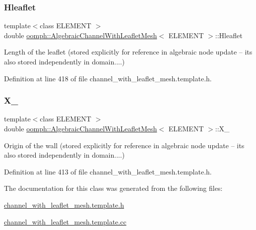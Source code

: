 \subsubsection{\texorpdfstring{Hleaflet}{Hleaflet}}
{\footnotesize\ttfamily template$<$class E\+L\+E\+M\+E\+NT $>$ \\
double \hyperlink{classoomph_1_1AlgebraicChannelWithLeafletMesh}{oomph\+::\+Algebraic\+Channel\+With\+Leaflet\+Mesh}$<$ E\+L\+E\+M\+E\+NT $>$\+::Hleaflet\hspace{0.3cm}{\ttfamily [protected]}}

Length of the leaflet (stored explicitly for reference in algebraic node update -- it\textquotesingle{}s also stored independently in domain....) 

Definition at line 418 of file channel\+\_\+with\+\_\+leaflet\+\_\+mesh.\+template.\+h.

\mbox{\label{classoomph_1_1AlgebraicChannelWithLeafletMesh_a1577beb584df4ad0f8517563934855fc}} 
\subsubsection{\texorpdfstring{X\+\_}{X\_0}}
{\footnotesize\ttfamily template$<$class E\+L\+E\+M\+E\+NT $>$ \\
double \hyperlink{classoomph_1_1AlgebraicChannelWithLeafletMesh}{oomph\+::\+Algebraic\+Channel\+With\+Leaflet\+Mesh}$<$ E\+L\+E\+M\+E\+NT $>$\+::X\+\_\hspace{0.3cm}{\ttfamily [protected]}}

Origin of the wall (stored explicitly for reference in algebraic node update -- it\textquotesingle{}s also stored independently in domain....) 

Definition at line 413 of file channel\+\_\+with\+\_\+leaflet\+\_\+mesh.\+template.\+h.



The documentation for this class was generated from the following files\+:\begin{DoxyCompactItemize}
\item 
\hyperlink{channel__with__leaflet__mesh_8template_8h}{channel\+\_\+with\+\_\+leaflet\+\_\+mesh.\+template.\+h}\item 
\hyperlink{channel__with__leaflet__mesh_8template_8cc}{channel\+\_\+with\+\_\+leaflet\+\_\+mesh.\+template.\+cc}\end{DoxyCompactItemize}
